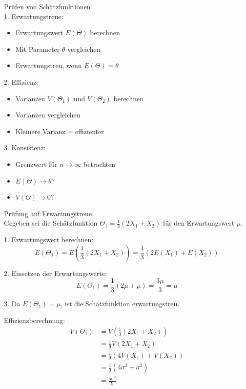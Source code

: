 \begin{KR}{Prüfen von Schätzfunktionen}\\
1. Erwartungstreue:
   \begin{itemize}
     \item Erwartungswert $E(\Theta)$ berechnen
     \item Mit Parameter $\theta$ vergleichen
     \item Erwartungstreu, wenn $E(\Theta)=\theta$
   \end{itemize}

2. Effizienz:
   \begin{itemize}
     \item Varianzen $V(\Theta_1)$ und $V(\Theta_2)$ berechnen
     \item Varianzen vergleichen
     \item Kleinere Varianz = effizienter
   \end{itemize}

3. Konsistenz:
   \begin{itemize}
     \item Grenzwert für $n \to \infty$ betrachten
     \item $E(\Theta) \to \theta$?
     \item $V(\Theta) \to 0$?
   \end{itemize}
\end{KR}

\begin{example2}{Prüfung auf Erwartungstreue}\\
Gegeben sei die Schätzfunktion $\Theta_1=\frac{1}{3}(2X_1+X_2)$ für den Erwartungswert $\mu$.

1. Erwartungswert berechnen:
   $$E(\Theta_1)=E(\frac{1}{3}(2X_1+X_2))=\frac{1}{3}(2E(X_1)+E(X_2))$$

2. Einsetzen der Erwartungswerte:
   $$E(\Theta_1)=\frac{1}{3}(2\mu+\mu)=\frac{3\mu}{3}=\mu$$

3. Da $E(\Theta_1)=\mu$, ist die Schätzfunktion erwartungstreu.

Effizienzberechnung:
$$
\begin{aligned}
V(\Theta_1) &= V(\frac{1}{3}(2X_1+X_2)) \\
&= \frac{1}{9}V(2X_1+X_2) \\
&= \frac{1}{9}(4V(X_1)+V(X_2)) \\
&= \frac{1}{9}(4\sigma^2+\sigma^2) \\
&= \frac{5\sigma^2}{9}
\end{aligned}
$$
\end{example2}

